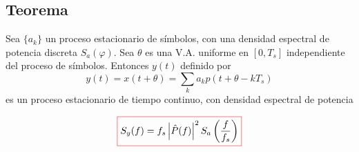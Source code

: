 \subsection*{Teorema}
Sea $\{a_k\}$ un proceso estacionario de símbolos, con una densidad espectral de potencia discreta $
S_a(\varphi)$. Sea  $\theta$ es una V.A. uniforme en
$[0,T_s]$ independiente del proceso de símbolos. Entonces $y(t)$ definido por
\[
 y(t)=x(t+\theta)=\displaystyle\sum_k
a_k p(t+\theta - kT_s)\]
es un proceso estacionario de tiempo continuo, con densidad espectral de potencia

\begin{equation}
   \label{eq.dig}
    {\color{Red}\boxed{\normalcolor S_y(f) = f_s \left|\hat{P}(f)\right|^2
    S_a\left(\frac{f}{f_s}\right)}}%
\end{equation}

